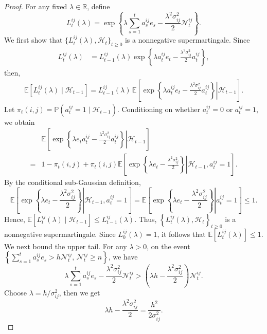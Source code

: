\documentclass[12pt]{article}
\begin{document}
\begin{proof}
For any fixed $\lambda\in\mathbb R$, define
\[
L_t^{ij}(\lambda)
=
\exp\left\{
\lambda \sum_{s=1}^t a_s^{ij} e_s
-
\frac{\lambda^2\sigma_{ij}^2}{2}
\mathcal N_t^{ij}
\right\}.
\]
We first show that $\{L_t^{ij}(\lambda),\mathcal H_t\}_{t\ge0}$ is a nonnegative supermartingale. Since
\begin{align*}
L_t^{ij}(\lambda)
&=
L_{t-1}^{ij}(\lambda)
\exp\left\{ \lambda a_t^{ij} e_t
- \frac{\lambda^2\sigma_{ij}^2}{2} a_t^{ij}
\right\},
\end{align*}
then,
\begin{align*}
\mathbb E\left[
L_t^{ij}(\lambda)
\mid
\mathcal H_{t-1}
\right] =
L_{t-1}^{ij}(\lambda)
\,
\mathbb E\left[
\left.
\exp\left\{
\lambda a_t^{ij} e_t 
- \frac{\lambda^2\sigma_{ij}^2}{2} a_t^{ij}
\right\}
\right|
\mathcal H_{t-1}
\right].
\end{align*}
Let $\pi_t(i,j) = \mathbb P\left( a_t^{ij}=1 \mid \mathcal H_{t-1} \right)$.
Conditioning on whether $a_t^{ij}=0$ or $a_t^{ij}=1$, we obtain
\begin{align*}
&
\mathbb E\left[
\left.
\exp\left\{
\lambda e_t a_t^{ij}
-
\frac{\lambda^2\sigma_{ij}^2}{2}
a_t^{ij}
\right\}
\right|
\mathcal H_{t-1}
\right]
\\
=&
1-\pi_t(i,j)+
\pi_t(i,j)
\mathbb E\left[
\left.
\exp\left\{
\lambda e_t
-
\frac{\lambda^2\sigma_{ij}^2}{2}
\right\}
\right|
\mathcal H_{t-1},
a_t^{ij}=1
\right].
\end{align*}
By the conditional sub-Gaussian definition,
\[
\mathbb E\left[
\left.
\exp\left\{
\lambda e_t -
\frac{\lambda^2\sigma_{ij}^2}{2}
\right\}
\right|
\mathcal H_{t-1},
a_t^{ij}=1
\right]
=
\mathbb E\left[
\left.
\exp\left\{
\lambda e_t -
\frac{\lambda^2\sigma_{ij}^2}{2}
\right\}
\right|
a_t^{ij}=1
\right] \le 1.
\]
Hence, $\mathbb E\left[ L_t^{ij}(\lambda) \mid \mathcal H_{t-1} \right] \le L_{t-1}^{ij}(\lambda)$.
Thus, $\left\{ L_t^{ij}(\lambda), \mathcal H_t \right\}_{t\ge 0}$ is a nonnegative supermartingale. Since $L_0^{ij}(\lambda)=1$, it follows that $\mathbb E\left[ L_t^{ij}(\lambda) \right] \le 1$. We next bound the upper tail.
For any $\lambda>0$, on the event $\left\{ \sum_{s=1}^t a_s^{ij} e_s  > h\mathcal N_t^{ij}, \, \mathcal N_t^{ij}\ge n \right\}$, we have
\[
\lambda \sum_{s=1}^t a_s^{ij} e_s
- \frac{\lambda^2\sigma_{ij}^2}{2}
\mathcal N_t^{ij} >
\left(\lambda h - \frac{\lambda^2\sigma_{ij}^2}{2} \right)
\mathcal N_t^{ij}.
\]
Choose $\lambda = {h}/{\sigma_{ij}^2}$, then we get
\[
\lambda h - \frac{\lambda^2\sigma_{ij}^2}{2}
= \frac{h^2}{2\sigma_{ij}^2}.
\]
\end{proof}
\end{document}
